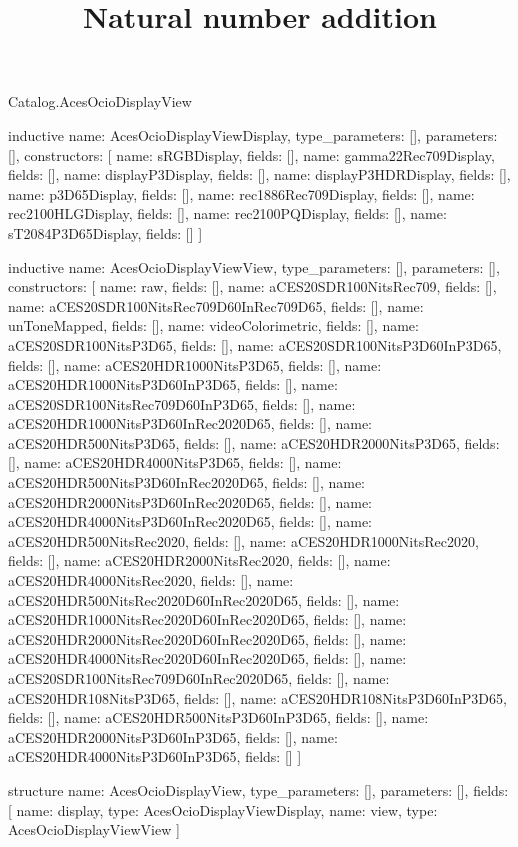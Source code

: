 \begin{lexlean}{Catalog.AcesOcioDisplayView}
\title{Natural number addition}
\begin{semanticmodule}
inductive{
  name: AcesOcioDisplayViewDisplay,
  type_parameters: [],
  parameters: [],
  constructors: [
    {name: sRGBDisplay, fields: []},
    {name: gamma22Rec709Display, fields: []},
    {name: displayP3Display, fields: []},
    {name: displayP3HDRDisplay, fields: []},
    {name: p3D65Display, fields: []},
    {name: rec1886Rec709Display, fields: []},
    {name: rec2100HLGDisplay, fields: []},
    {name: rec2100PQDisplay, fields: []},
    {name: sT2084P3D65Display, fields: []}
  ]
}

inductive{
  name: AcesOcioDisplayViewView,
  type_parameters: [],
  parameters: [],
  constructors: [
    {name: raw, fields: []},
    {name: aCES20SDR100NitsRec709, fields: []},
    {name: aCES20SDR100NitsRec709D60InRec709D65, fields: []},
    {name: unToneMapped, fields: []},
    {name: videoColorimetric, fields: []},
    {name: aCES20SDR100NitsP3D65, fields: []},
    {name: aCES20SDR100NitsP3D60InP3D65, fields: []},
    {name: aCES20HDR1000NitsP3D65, fields: []},
    {name: aCES20HDR1000NitsP3D60InP3D65, fields: []},
    {name: aCES20SDR100NitsRec709D60InP3D65, fields: []},
    {name: aCES20HDR1000NitsP3D60InRec2020D65, fields: []},
    {name: aCES20HDR500NitsP3D65, fields: []},
    {name: aCES20HDR2000NitsP3D65, fields: []},
    {name: aCES20HDR4000NitsP3D65, fields: []},
    {name: aCES20HDR500NitsP3D60InRec2020D65, fields: []},
    {name: aCES20HDR2000NitsP3D60InRec2020D65, fields: []},
    {name: aCES20HDR4000NitsP3D60InRec2020D65, fields: []},
    {name: aCES20HDR500NitsRec2020, fields: []},
    {name: aCES20HDR1000NitsRec2020, fields: []},
    {name: aCES20HDR2000NitsRec2020, fields: []},
    {name: aCES20HDR4000NitsRec2020, fields: []},
    {name: aCES20HDR500NitsRec2020D60InRec2020D65, fields: []},
    {name: aCES20HDR1000NitsRec2020D60InRec2020D65, fields: []},
    {name: aCES20HDR2000NitsRec2020D60InRec2020D65, fields: []},
    {name: aCES20HDR4000NitsRec2020D60InRec2020D65, fields: []},
    {name: aCES20SDR100NitsRec709D60InRec2020D65, fields: []},
    {name: aCES20HDR108NitsP3D65, fields: []},
    {name: aCES20HDR108NitsP3D60InP3D65, fields: []},
    {name: aCES20HDR500NitsP3D60InP3D65, fields: []},
    {name: aCES20HDR2000NitsP3D60InP3D65, fields: []},
    {name: aCES20HDR4000NitsP3D60InP3D65, fields: []}
  ]
}

structure{
  name: AcesOcioDisplayView,
  type_parameters: [],
  parameters: [],
  fields: [
    {name: display, type: AcesOcioDisplayViewDisplay},
    {name: view, type: AcesOcioDisplayViewView}
  ]
}
\end{semanticmodule}
\end{lexlean}
